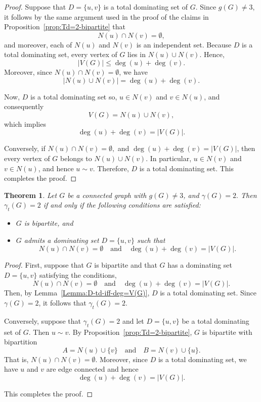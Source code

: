 \documentclass[12pt]{amsart}
\theoremstyle{plain}
\newtheorem{theorem}{Theorem}[section]
\theoremstyle{definition}
\begin{document}
\begin{proof}
Suppose that $D=\{u,v\}$ is a total dominating set of $G$. Since $g(G)\neq 3$, it follows by the same argument used in the proof of the claims in Proposition~\ref{prop:Td=2-bipartite} that
\[
N(u)\cap N(v)=\emptyset,
\]
and moreover, each of $N(u)$ and $N(v)$ is an independent set. Because $D$ is a total dominating set, every vertex of $G$ lies in $N(u)\cup N(v)$. Hence,
\[
|V(G)| \le \deg(u) + \deg(v).
\]
Moreover, since $N(u)\cap N(v)=\emptyset$, we have
\[
|N(u)\cup N(v)| = \deg(u)+\deg(v).
\]

Now, $D$ is a total dominating set so, $u\in N(v)$ and $v\in N(u)$, and consequently
\[
V(G)=N(u)\cup N(v),
\]
which implies
\[
\deg(u)+\deg(v)=|V(G)|.
\]

Conversely, if $N(u)\cap N(v)=\emptyset,$ and $\deg(u)+\deg(v)=|V(G)|$, then every vertex of $G$ belongs to $N(u)\cup N(v)$. In particular, $u\in N(v)$ and $v\in N(u)$, and hence $u\sim v$. Therefore, $D$ is a total dominating set. This completes the proof.
\end{proof}




\begin{theorem}
Let $G$ be a connected graph with $g(G)\neq 3$, and $\gamma(G)=2.$ 
Then $\gamma_t(G)=2$ if and only if the following conditions are satisfied:
\begin{itemize}
    \item $G$ is bipartite, and
    \item $G$ admits a dominating set $D=\{u,v\}$ such that 
    \[
    N(u)\cap N(v)=\emptyset 
    \quad \text{and} \quad 
    \deg(u)+\deg(v)=|V(G)|.
    \]
\end{itemize}
\end{theorem}


\begin{proof}
First, suppose that $G$ is bipartite and that $G$ has a dominating set 
$D=\{u,v\}$ satisfying the conditions, \[
    N(u)\cap N(v)=\emptyset 
    \quad \text{and} \quad 
    \deg(u)+\deg(v)=|V(G)|.
    \]
Then, by Lemma~\ref{Lemma:D-td-iff-deg=V(G)}, $D$ is a total dominating set. 
Since $\gamma(G)=2$, it follows that $\gamma_t(G)=2$.

Conversely, suppose that $\gamma_t(G)=2$ and let $D=\{u,v\}$ be a total dominating set of $G$. 
Then $u\sim v$. By Proposition~\ref{prop:Td=2-bipartite}, $G$ is bipartite with bipartition
\[
A=N(u)\cup\{v\}
\quad \text{and} \quad
B=N(v)\cup\{u\}.
\] That is, $N(u)\cap N(v)=\emptyset.$
Moreover, since $D$ is a total dominating set, we have $u$ and $v$ are edge connected and hence
\[
\deg(u)+\deg(v)=|V(G)|.
\]

This completes the proof.
\end{proof}
\end{document}
